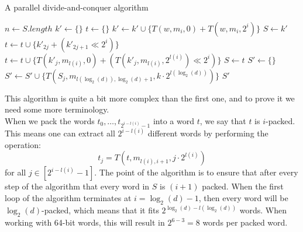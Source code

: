 \begin{algorithm}[H]
\caption{A parallel divide-and-conquer algorithm}\label{alg:parallel-d-and-c}
    \begin{algorithmic}[1]
         
            \State $n \gets S.length$
                \State $k' \gets \{\}$
                \State $t \gets \{\}$
                    \State $k' \gets k' \cup \{T(w, m_i, 0) + T(w, m_i, 2^i)\}$
                \EndFor
                    \State $S \gets k'$
                \Else
                    \State $t \gets t \cup \{k'_{2j} + (k'_{2j+1} \ll 2^i)\}$ %
                    \EndFor
                \Else
                        \State $t \gets t \cup \{T(k'_{j}, m_{l(i)}, 0) + (T(k'_{j}, m_{l(i)}, 2^{l(i)}) \ll 2^{i})\}$
                    \EndFor
                \EndIf
                \State $S \gets t$
                \EndIf
            \EndFor
            \State $S' \gets \{\}$
             
                \State $S' \gets S' \cup \{T(S_j, m_{l(\log_2(d)), \log_2(d) + 1}, k\cdot 2^{l(\log_2(d))})\}$
                \EndFor
            \EndFor
            \State \Return $S'$
        \EndFunction
    \end{algorithmic}
\end{algorithm}
This algorithm is quite a bit more complex than the first one, and to prove it we need some more terminology.\\
When we pack the words $t_0, \dots, t_{2^{i-l(i)}-1}$ into a word $t$, we say that $t$ is $i$-packed. This means one can extract all $2^{i-l(i)}$ different words by performing the operation:
\begin{equation}
    \label{eq:extract-from-embed}
t_j=T(t, m_{l(i), i+1}, j\cdot 2^{l(i)})
\end{equation}
for all $j\in [2^{i-l(i)}-1]$.
The point of the algorithm is to ensure that after every step of the algorithm that every word in $S$ is $(i+1)$ packed. When the first loop of the algorithm terminates at $i=\log_2(d)-1$, then every word will be $\log_2(d)$-packed, which means that it fits $2^{\log_2(d)-l(\log_2(d))}$ words. When working with 64-bit words, this will result in $2^{6-3}=8$ words per packed word.
